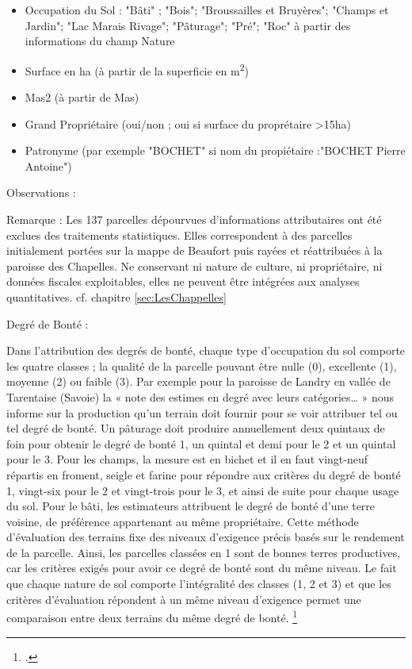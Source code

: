 \documentclass[12pt,a4paper]{report}
\begin{document}
\begin{itemize}
	\item Occupation du Sol : "Bâti" ; "Bois"; "Broussailles et Bruyères"; "Champs et Jardin"; "Lac Marais Rivage"; "Pâturage"; "Pré"; "Roc" à partir des informations du champ Nature
	\item Surface en ha (à partir de la superficie en m\textsuperscript{2})
	\item Mas2 (à partir de Mas)
	\item Grand Propriétaire (oui/non ; oui si surface du proprétaire >15ha)
	\item Patronyme   (par exemple "BOCHET" si nom du propiétaire :"BOCHET Pierre Antoine")
\end{itemize}

Observations : 

Remarque : Les 137 parcelles dépourvues d'informations attributaires ont été exclues des traitements statistiques. Elles correspondent à des parcelles initialement portées sur la mappe de Beaufort puis rayées et réattribuées à la paroisse des Chapelles. Ne conservant ni nature de culture, ni propriétaire, ni données fiscales exploitables, elles ne peuvent être intégrées aux analyses quantitatives. cf. chapitre \ref{sec:LesChappelles}

Degré de Bonté :

Dans l’attribution des degrés de bonté, chaque type d’occupation du sol comporte les quatre classes ; la qualité de la parcelle pouvant être nulle (0), excellente (1), moyenne (2) ou faible (3). Par exemple pour la paroisse de Landry en vallée de Tarentaise (Savoie) la « note des estimes en degré avec leurs catégories… » nous informe sur la production qu’un terrain doit fournir pour se voir attribuer tel ou tel degré de bonté. Un pâturage doit produire annuellement deux quintaux de foin pour obtenir le degré de bonté 1, un quintal et demi pour le 2 et un quintal pour le 3. Pour les champs, la mesure est en bichet et il en faut vingt-neuf répartis en froment, seigle et farine pour répondre aux critères du degré de bonté 1, vingt-six pour le 2 et vingt-trois pour le 3, et ainsi de suite pour chaque usage du sol. Pour le bâti, les estimateurs attribuent le degré de bonté d’une terre voisine, de préférence appartenant au même propriétaire. Cette méthode d’évaluation des terrains fixe des niveaux d’exigence précis basés sur le rendement de la parcelle. Ainsi, les parcelles classées en 1 sont de bonnes terres productives, car les critères exigés pour avoir ce degré de bonté sont du même niveau. Le fait que chaque nature de sol comporte l’intégralité des classes (1, 2 et 3) et que les critères d’évaluation répondent à un même niveau d’exigence permet une comparaison entre deux terrains du même degré de bonté. \footcite[81--93]{Baud2010} 
\end{document}
